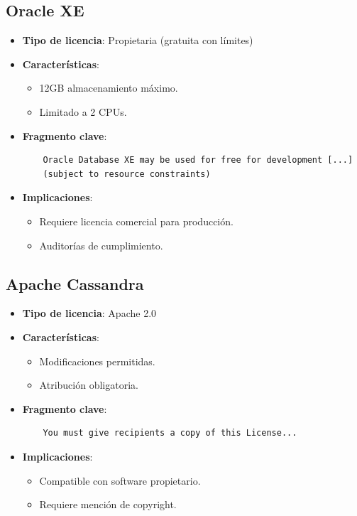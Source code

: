 \documentclass{article}
\begin{document}
\subsection{Oracle XE}
\begin{itemize}
    \item \textbf{Tipo de licencia}: Propietaria (gratuita con límites)
    \item \textbf{Características}:
    \begin{itemize}
        \item 12GB almacenamiento máximo.
        \item Limitado a 2 CPUs.
    \end{itemize}
    \item \textbf{Fragmento clave}:
    \begin{verbatim}
    Oracle Database XE may be used for free for development [...] 
    (subject to resource constraints)
    \end{verbatim}
    \item \textbf{Implicaciones}:
    \begin{itemize}
        \item Requiere licencia comercial para producción.
        \item Auditorías de cumplimiento.
    \end{itemize}
\end{itemize}

\subsection{Apache Cassandra}
\begin{itemize}
    \item \textbf{Tipo de licencia}: Apache 2.0
    \item \textbf{Características}:
    \begin{itemize}
        \item Modificaciones permitidas.
        \item Atribución obligatoria.
    \end{itemize}
    \item \textbf{Fragmento clave}:
    \begin{verbatim}
    You must give recipients a copy of this License...
    \end{verbatim}
    \item \textbf{Implicaciones}:
    \begin{itemize}
        \item Compatible con software propietario.
        \item Requiere mención de copyright.
    \end{itemize}
\end{itemize}
\end{document}

